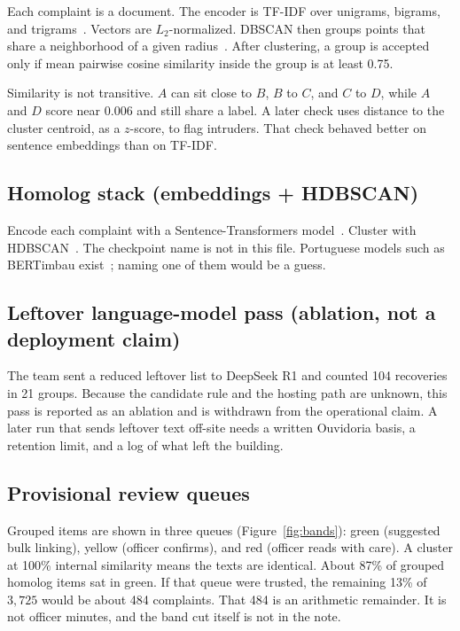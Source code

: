 \documentclass[acmlarge,screen]{acmart}
\begin{document}
Each complaint is a document. The encoder is TF-IDF over unigrams, bigrams, and trigrams~\cite{salton1988term}. Vectors are $L_2$-normalized. DBSCAN then groups points that share a neighborhood of a given radius~\cite{ester1996dbscan}. After clustering, a group is accepted only if mean pairwise cosine similarity inside the group is at least 0.75.

Similarity is not transitive. $A$ can sit close to $B$, $B$ to $C$, and $C$ to $D$, while $A$ and $D$ score near 0.006 and still share a label. A later check uses distance to the cluster centroid, as a $z$-score, to flag intruders. That check behaved better on sentence embeddings than on TF-IDF.

\subsection{Homolog stack (embeddings + HDBSCAN)}

Encode each complaint with a Sentence-Transformers model~\cite{reimers2019sbert}. Cluster with HDBSCAN~\cite{campello2013hdbscan}. The checkpoint name is not in this file. Portuguese models such as BERTimbau exist~\cite{souza2020bertimbau}; naming one of them would be a guess.

\subsection{Leftover language-model pass (ablation, not a deployment claim)}

The team sent a reduced leftover list to DeepSeek R1 and counted 104 recoveries in 21 groups. Because the candidate rule and the hosting path are unknown, this pass is reported as an ablation and is withdrawn from the operational claim. A later run that sends leftover text off-site needs a written Ouvidoria basis, a retention limit, and a log of what left the building.

\subsection{Provisional review queues}

Grouped items are shown in three queues (Figure~\ref{fig:bands}): green (suggested bulk linking), yellow (officer confirms), and red (officer reads with care). A cluster at 100\% internal similarity means the texts are identical. About 87\% of grouped homolog items sat in green. If that queue were trusted, the remaining 13\% of $3{,}725$ would be about 484 complaints. That 484 is an arithmetic remainder. It is not officer minutes, and the band cut itself is not in the note.
\end{document}
